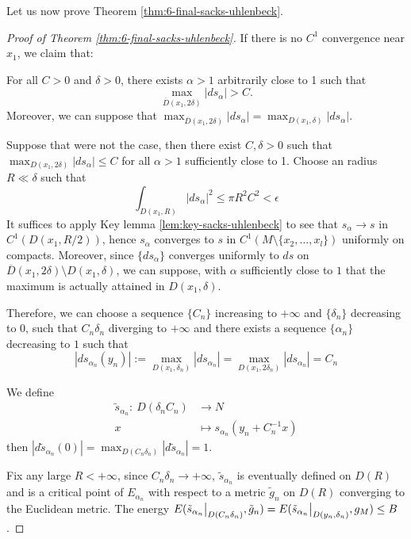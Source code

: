Let us now prove Theorem \ref{thm:6-final-sacks-uhlenbeck}.

\begin{proof}[Proof of Theorem \ref{thm:6-final-sacks-uhlenbeck}]
If there is no \(C^1\) convergence near \(x_1\), we claim that:

\begin{assertion}
\label{assert:3-star}
For all \(C>0\) and \(\delta >0\), there exists \(\alpha >1\) arbitrarily close to 1 such that
\[
 \max_{\overline{D}(x_1,2\delta)}|ds_\alpha|  > C.
\]
Moreover, we can suppose that \(\max_{\overline{D}(x_1,2\delta)}|ds_\alpha| = \max_{D(x_1,\delta)}|ds_\alpha|\).
\end{assertion}


Suppose that were not the case, then there exist \(C,\delta >0\) such that \(\max_{D(x_1,2\delta)} |ds_\alpha| \leq C\) for all \(\alpha>1\) sufficiently close
to 1. Choose an radius \(R \ll \delta\) such that
\[
 \int_{D(x_1,R)} |ds_\alpha|^2 \leq \pi R^2 C^2 <\epsilon
\]
It suffices to apply Key lemma \ref{lem:key-sacks-uhlenbeck} to see that \(s_\alpha \to s\) in \(C^1(D(x_1,R/2))\), hence \(s_\alpha\) converges to \(s\) in \(C^1(M\setminus\{x_2,\dots,x_l\})\) uniformly on compacts. Moreover, since \(\{ds_\alpha\}\) converges uniformly to \(ds\) on \(\overline{D}(x_1,2\delta)\setminus
D(x_1,\delta)\), we can suppose, with \(\alpha\) sufficiently close to \(1\) that the
maximum is actually attained in \(D(x_1,\delta)\).


Therefore, we can choose a sequence \(\{C_n\}\) increasing to \(+\infty\) and \(\{\delta_n\}\)
decreasing to \(0\), such that \(C_n\delta_n\) diverging to \(+\infty\) and there exists a sequence \(\{\alpha_n\}\) decreasing to \(1\)
such that
\[
 \left| ds_{\alpha_n}(y_n)\right|:=\max_{D(x_1,\delta_n)}|ds_{\alpha_n}|=\max_{D(x_1,2\delta_n)}|ds_{\alpha_n}| = C_n
\]

We define 
\begin{align*}
  \tilde s_{\alpha_n}:\ D(\delta_n C_n) & \longrightarrow N \\
  	 		x	   	&\longmapsto 	  s_{\alpha_n}(y_n + C^{-1}_nx)
\end{align*}
then \(|d\tilde s_{\alpha_n}(0)|= \max_{D(C_n\delta_n)}|d\tilde s_{\alpha_n}| = 1\).

Fix any large \(R <+\infty\), since \(C_n\delta_n\to +\infty\), \(\tilde s_{\alpha_n}\)  is eventually defined on \(D(R)\) and is a critical point of \(E_{\alpha_n}\) with
respect to a metric \(\tilde g_n\) on \(D(R)\) converging to the Euclidean metric. The
energy \(E(\restr{\tilde s_{\alpha_n}}{D(C_n\delta_n)},\tilde g_n) = E(\restr{\tilde
s_{\alpha_n}}{D(y_n,\delta_n)},g_M)\leq B\).


\end{proof}
